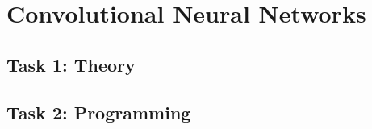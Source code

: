 \section{Convolutional Neural Networks}
\subsection{Task 1: Theory}

\newpage
\subsection{Task 2: Programming}
